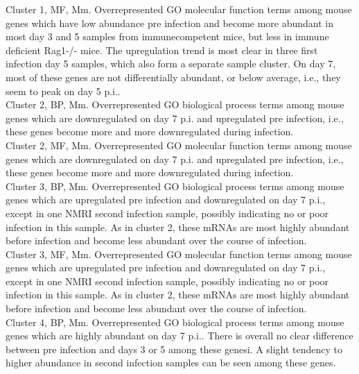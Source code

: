 \documentclass{article}
\begin{document}
  Cluster 1, MF, Mm.
  Overrepresented GO molecular function terms among mouse genes which have low abundance pre infection and 
  become more abundant in most day 3 and 5 samples from immunecompetent mice, but less in immune deficient Rag1-/- mice. 
  The upregulation trend is most clear in three first infection day 5 samples, which also form a separate
  sample cluster. On day 7, most of these genes are not differentially abundant, or below average, i.e., they
  seem to peak on day 5 p.i..\\
  
  
  Cluster 2, BP, Mm.
  Overrepresented GO biological process terms among mouse genes which are downregulated on day 7 p.i. and
  upregulated pre infection, i.e., these genes become more and more downregulated during infection.\\
  

  Cluster 2, MF, Mm.
  Overrepresented GO molecular function terms among mouse genes which are downregulated on day 7 p.i. and
  upregulated pre infection, i.e., these genes become more and more downregulated during infection.\\
  
 
  Cluster 3, BP, Mm.
  Overrepresented GO biological process terms among mouse genes which are upregulated pre infection and
  downregulated on day 7 p.i., except in one NMRI second infection sample, possibly indicating no or
  poor infection in this sample. As in cluster 2, these mRNAs are most highly abundant before infection and
  become less abundant over the course of infection.\\
  
  
  Cluster 3, MF, Mm.
  Overrepresented GO molecular function terms among mouse genes which are upregulated pre infection and
  downregulated on day 7 p.i., except in one NMRI second infection sample, possibly indicating no or
  poor infection in this sample. As in cluster 2, these mRNAs are most highly abundant before infection and
  become less abundant over the course of infection.\\
  
  
  Cluster 4, BP, Mm.
  Overrepresented GO biological process terms among mouse genes which are highly abundant on day 7 p.i.. 
  There is overall no clear difference between pre infection and days 3 or 5 among these genesi. A slight
  tendency to higher abundance in second infection samples can be seen among these genes.\\
  
  
\end{document}

